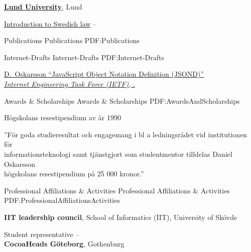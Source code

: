 \documentclass[letterpaper,MMMyyyy,nonstopmode]{resume}
\begin{document}
\begin{Body}
\BigGap
\Entry
\href{https://www.law.lu.se/}
{\textbf{Lund University}},
Lund

\Gap
\BulletItem
\href{https://www.lu.se/lubas/i-uoh-lu-JURF11}
{Introduction to Swedish law}
\hfill
{} --


\Section
{Publications}
{Publications}
{PDF:Publications}

\SubSection
{Internet-Drafts}
{Internet-Drafts}
{PDF:Internet-Drafts}

\begingroup
\renewcommand{\MaxNumberedItem}{[88]}

\BigGap
\BulletItem
\href{https://www.ietf.org/archive/id/draft-oskarsson-jsond-00.txt}
{\underline{D.~Oskarsson}
``JavaScript Object Notation Definition (JSOND)''\\
\textit{Internet Engineering Task Force (IETF)}, .}

\endgroup



\Section
{Awards \&\newline
Scholarships}
{Awards \& Scholarships}
{PDF:AwardsAndScholarships}

\BulletItem
Högskolans resestipendium av år 1990
\hfill
{}
\begin{Detail}
\Item
''För goda studieresultat och engagemang i bl a ledningsrådet vid institutionen för\\
informationsteknologi samt tjänstgjort som studentmentor tilldelas Daniel Oskarsson\\
högskolans resestipendium på 25 000 kronor.''
\end{Detail}


\Section
{Professional Affiliations\newline
\& Activities}
{Professional Affiliations \& Activities}
{PDF:ProfessionalAffiliationsActivities}

\Entry
\textbf{IIT leadership council}, School of Informatics (IIT), University of Skövde

\Gap
\BulletItem
Student representative
\hfill
{} -- 
\\
\Entry
\textbf{CocoaHeads Göteborg}, Gothenburg


\end{Body}
\end{document}
